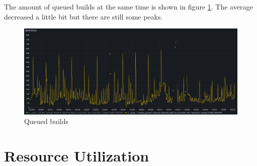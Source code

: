 The amount of queued builds at the same time is shown in figure \ref{fig:queued-builds}. The average decreased a little bit but there are still some peaks.

\begin{figure}[htbp]
    \centering
    \includegraphics[width=\textwidth]{graphics/builds queued.png}
    \caption{Queued builds}
    \label{fig:queued-builds}
\end{figure}

\section{Resource Utilization}%
\label{sec:resource-utilization}

